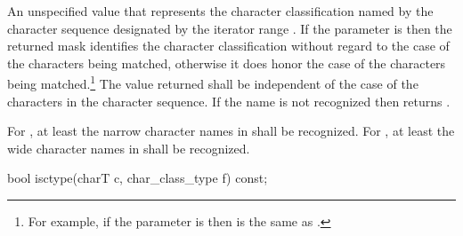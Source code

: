\begin{itemdescr}
\pnum\returns An unspecified value that represents
the character classification named by the character sequence
designated by the iterator range .
If the parameter  is  then the returned mask identifies the
character classification without regard to the case of the characters being
matched, otherwise it does honor the case of the characters being
matched.\footnote{For example, if the parameter  is  then
\tcode{[[:lower:]]} is the same as \tcode{[[:alpha:]]}.}
The value
returned shall be independent of the case of the characters in
the character sequence. If the name
is not recognized then returns .

\pnum
\remarks  For , at least the narrow character names
in  shall be recognized.
For , at least the wide character names
in  shall be recognized.
\end{itemdescr}

%
\begin{itemdecl}
bool isctype(charT c, char_class_type f) const;
\end{itemdecl}

